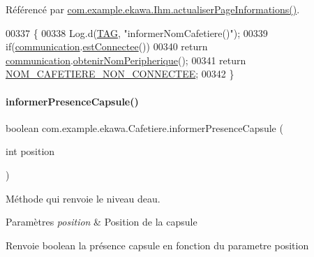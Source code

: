 Référencé par \hyperlink{_ihm_8java_source_l00919}{com.\+example.\+ekawa.\+Ihm.\+actualiser\+Page\+Informations()}.


\begin{DoxyCode}
00337     \{
00338         Log.d(\hyperlink{classcom_1_1example_1_1ekawa_1_1_cafetiere_aa0c1fd99a2508b06c462aea17034aa91}{TAG}, \textcolor{stringliteral}{"informerNomCafetiere()"});
00339         \textcolor{keywordflow}{if}(\hyperlink{classcom_1_1example_1_1ekawa_1_1_cafetiere_af9506a7805d000d2cb83444cdb8ea889}{communication}.\hyperlink{classcom_1_1example_1_1ekawa_1_1_communication_a0c591a578528edaa5bb665cede5738bc}{estConnectee}())
00340             \textcolor{keywordflow}{return} \hyperlink{classcom_1_1example_1_1ekawa_1_1_cafetiere_af9506a7805d000d2cb83444cdb8ea889}{communication}.\hyperlink{classcom_1_1example_1_1ekawa_1_1_communication_a133dd63afcf2d2f1229a416abe099494}{obtenirNomPeripherique}();
00341         \textcolor{keywordflow}{return} \hyperlink{classcom_1_1example_1_1ekawa_1_1_cafetiere_a5b10663105c7e3fd28dfd9d51b5e925f}{NOM\_CAFETIERE\_NON\_CONNECTEE};
00342     \}
\end{DoxyCode}
\mbox{\label{classcom_1_1example_1_1ekawa_1_1_cafetiere_a35a291f849346b374f63324bc3ecd70b}} 
\paragraph{\texorpdfstring{informer\+Presence\+Capsule()}{informerPresenceCapsule()}}
{\footnotesize\ttfamily boolean com.\+example.\+ekawa.\+Cafetiere.\+informer\+Presence\+Capsule (\begin{DoxyParamCaption}\item[{int}]{position }\end{DoxyParamCaption})}



Méthode qui renvoie le niveau d\textquotesingle{}eau. 


\begin{DoxyParams}{Paramètres}
{\em position} & Position de la capsule \\
\hline
\end{DoxyParams}
\begin{DoxyReturn}{Renvoie}
boolean la présence capsule en fonction du parametre position 
\end{DoxyReturn}


